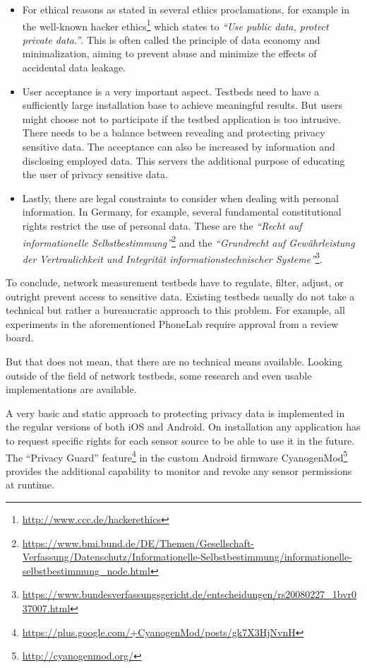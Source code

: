 \begin{itemize}

	\item For ethical reasons as stated in several ethics proclamations, for example in the well-known hacker ethics\footnote{\url{http://www.ccc.de/hackerethics}} which states to \textit{``Use public data, protect private data.''}. This is often called the principle of data economy and minimalization, aiming to prevent abuse and minimize the effects of accidental data leakage.

	\item User acceptance is a very important aspect. Testbeds need to have a sufficiently large installation base to achieve meaningful results. But users might choose not to participate if the testbed application is too intrusive. There needs to be a balance between revealing and protecting privacy sensitive data. The acceptance can also be increased by information and disclosing employed data. This servers the additional purpose of educating the user of privacy sensitive data.

	\item Lastly, there are legal constraints to consider when dealing with personal information. In Germany, for example, several fundamental constitutional rights restrict the use of personal data. These are the \textit{``Recht auf informationelle Selbstbestimmung''}\footnote{\url{https://www.bmi.bund.de/DE/Themen/Gesellschaft-Verfassung/Datenschutz/Informationelle-Selbstbestimmung/informationelle-selbstbestimmung_node.html}} and the \textit{``Grundrecht auf Gewährleistung der Vertraulichkeit und Integrität informationstechnischer Systeme''}\footnote{\url{https://www.bundesverfassungsgericht.de/entscheidungen/rs20080227_1bvr037007.html}}.

\end{itemize}

To conclude, network measurement testbeds have to regulate, filter, adjust, or outright prevent access to sensitive data. Existing testbeds usually do not take a technical but rather a bureaucratic approach to this problem. For example, all experiments in the aforementioned PhoneLab require approval from a review board.

But that does not mean, that there are no technical means available. Looking outside of the field of network testbeds, some research and even usable implementations are available.

A very basic and static approach to protecting privacy data is implemented in the regular versions of both iOS and Android. On installation any application has to request specific rights for each sensor source to be able to use it in the future. 
The ``Privacy Guard'' feature\footnote{\url{https://plus.google.com/+CyanogenMod/posts/gk7X3HjNvnH}} in the custom Android firmware CyanogenMod\footnote{\url{http://cyanogenmod.org/}} provides the additional capability to monitor and revoke any sensor permissions at runtime.


